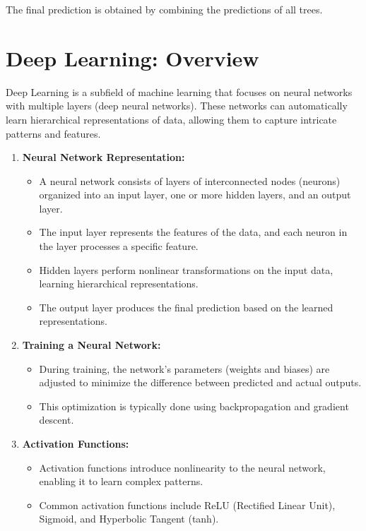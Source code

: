 \documentclass{article}
\begin{document}
The final prediction is obtained by combining the predictions of all trees.

\section{Deep Learning: Overview}

Deep Learning is a subfield of machine learning that focuses on neural networks with multiple layers (deep neural networks). These networks can automatically learn hierarchical representations of data, allowing them to capture intricate patterns and features.

\begin{enumerate}
    \item \textbf{Neural Network Representation:}
        \begin{itemize}
            \item A neural network consists of layers of interconnected nodes (neurons) organized into an input layer, one or more hidden layers, and an output layer.
            \item The input layer represents the features of the data, and each neuron in the layer processes a specific feature.
            \item Hidden layers perform nonlinear transformations on the input data, learning hierarchical representations.
            \item The output layer produces the final prediction based on the learned representations.
        \end{itemize}
    
    \item \textbf{Training a Neural Network:}
        \begin{itemize}
            \item During training, the network's parameters (weights and biases) are adjusted to minimize the difference between predicted and actual outputs.
            \item This optimization is typically done using backpropagation and gradient descent.
        \end{itemize}
    
    \item \textbf{Activation Functions:}
        \begin{itemize}
            \item Activation functions introduce nonlinearity to the neural network, enabling it to learn complex patterns.
            \item Common activation functions include ReLU (Rectified Linear Unit), Sigmoid, and Hyperbolic Tangent (tanh).
        \end{itemize}
    

\end{enumerate}
\end{document}
